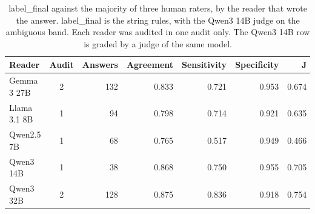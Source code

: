 \begin{table}[t]
\centering\small
\setlength{\tabcolsep}{4pt}
\caption{label\_final against the majority of three human raters, by the reader that wrote the answer. label\_final is the string rules, with the Qwen3 14B judge on the ambiguous band. Each reader was audited in one audit only. The Qwen3 14B row is graded by a judge of the same model.}
\label{tab:rev2_agreement}
\begin{tabular*}{\linewidth}{@{\extracolsep{\fill}}lcrrrrr}
\toprule
Reader & Audit & Answers & Agreement & Sensitivity & Specificity & J \\
\midrule
Gemma 3 27B & 2 & 132 & 0.833 & 0.721 & 0.953 & 0.674 \\
Llama 3.1 8B & 1 & 94 & 0.798 & 0.714 & 0.921 & 0.635 \\
Qwen2.5 7B & 1 & 68 & 0.765 & 0.517 & 0.949 & 0.466 \\
Qwen3 14B & 1 & 38 & 0.868 & 0.750 & 0.955 & 0.705 \\
Qwen3 32B & 2 & 128 & 0.875 & 0.836 & 0.918 & 0.754 \\
\bottomrule
\end{tabular*}
\end{table}
